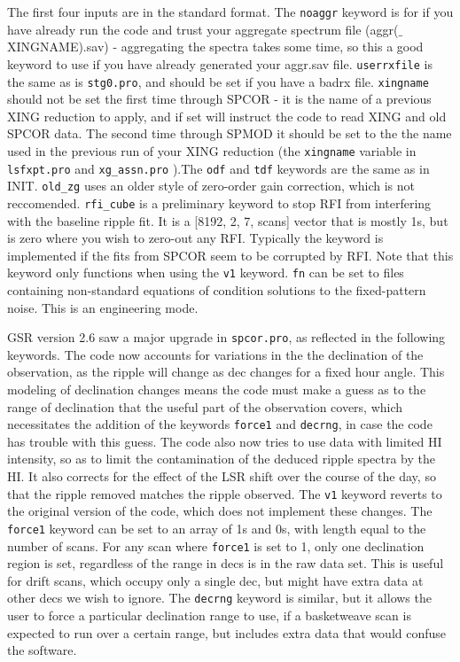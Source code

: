 \documentclass[11pt]{article}
\begin{document}
The first four inputs are in the standard format. The \texttt{noaggr} keyword is for if you have already run the code and trust your aggregate spectrum file (aggr($\_$XINGNAME).sav) - aggregating the spectra takes some time, so this a good keyword to use if you have already generated your aggr.sav file. \texttt{userrxfile} is the same as is \texttt{stg0.pro}, and should be set if you have a badrx file. \texttt{xingname} should not be set the first time through SPCOR - it is the name of a previous XING reduction to apply, and if set will instruct the code to read XING and old SPCOR data. The second time through SPMOD it should be set to the the name used in the previous run of your XING reduction (the \texttt{xingname} variable in \texttt{lsfxpt.pro} and \texttt{xg\_assn.pro} ).The \texttt{odf} and \texttt{tdf} keywords are the same as in INIT. \texttt{old\_zg} uses an older style of zero-order gain correction, which is not reccomended. \texttt{rfi\_cube} is a preliminary keyword to stop RFI from interfering with the baseline ripple fit. It is a [8192, 2, 7, scans] vector that is mostly 1s, but is zero where you wish to zero-out any RFI. Typically the keyword is implemented if the fits from SPCOR seem to be corrupted by RFI. Note that this keyword only functions when using the \texttt{v1} keyword. \texttt{fn} can be set to files containing non-standard equations of condition solutions to the fixed-pattern noise. This is an engineering mode.

GSR version 2.6 saw a major upgrade in \texttt{spcor.pro}, as reflected in the following keywords. The code now accounts for variations in the the declination of the observation, as the ripple will change as dec changes for a fixed hour angle. This modeling of declination changes means the code must make a guess as to the range of declination that the useful part of the observation covers, which necessitates the addition of the keywords \texttt{force1} and \texttt{decrng}, in case the code has trouble with this guess. The code also now tries to use data with limited HI intensity, so as to limit the contamination of the deduced ripple spectra by the HI. It also corrects for the effect of the LSR shift over the course of the day, so that the ripple removed matches the ripple observed. The \texttt{v1} keyword reverts to the original version of the code, which does not implement these changes. The \texttt{force1} keyword can be set to an array of 1s and 0s, with length equal to the number of scans. For any scan where \texttt{force1} is set to 1, only one declination region is set, regardless of the range in decs is in the raw data set. This is useful for drift scans, which occupy only a single dec, but might have extra data at other decs we wish to ignore. The \texttt{decrng} keyword is similar, but it allows the user to force a particular declination range to use, if a basketweave scan is expected to run over a certain range, but includes extra data that would confuse the software. 
\end{document}
